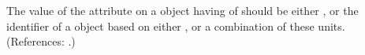 The value of the attribute  on a \Compartment object having
 of  should be either 
, or the identifier of a \UnitDefinition object based on
either  , or a combination of these units.  (References: .)
